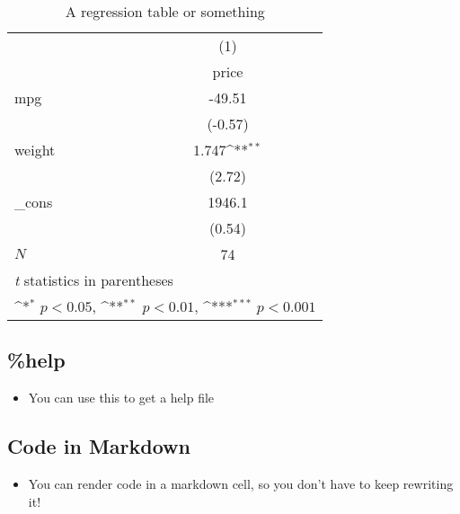 \documentclass[10pt,parskip=half,
	toc=sectionentrywithdots,
	bibliography=totocnumbered,
	captions=tableheading,numbers=noendperiod]{scrartcl}
\providecommand{\tightlist}{%
  \setlength{\itemsep}{0pt}\setlength{\parskip}{0pt}}
\begin{document}
\begin{table}[H]\caption{A regression table or something}\label{tbl:tlabelreg2}

\centering
\begin{adjustbox}{max width=\textwidth}

{
\def\sym#1{\ifmmode^{#1}\else\(^{#1}\)\fi}
\begin{tabular}{l*{1}{c}}
\hline\hline
            &\multicolumn{1}{c}{(1)}\\
            &\multicolumn{1}{c}{price}\\
\hline
mpg         &      -49.51         \\
            &     (-0.57)         \\
[1em]
weight      &       1.747\sym{**} \\
            &      (2.72)         \\
[1em]
\_cons      &      1946.1         \\
            &      (0.54)         \\
\hline
\(N\)       &          74         \\
\hline\hline
\multicolumn{2}{l}{\footnotesize \textit{t} statistics in parentheses}\\
\multicolumn{2}{l}{\footnotesize \sym{*} \(p<0.05\), \sym{**} \(p<0.01\), \sym{***} \(p<0.001\)}\\
\end{tabular}
}

\end{adjustbox}
\end{table}

\hypertarget{help}{%
\subsection{\%help}\label{help}}

\begin{itemize}
\tightlist
\item
  You can use this to get a help file
\end{itemize}

\hypertarget{code-in-markdown}{%
\subsection{Code in Markdown}\label{code-in-markdown}}

\begin{itemize}
\tightlist
\item
  You can render code in a markdown cell, so you don't have to keep
  rewriting it!
\end{itemize}
\end{document}
